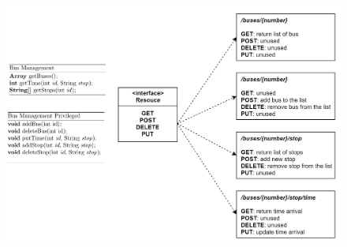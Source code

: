 \documentclass{article}
\begin{document}
\begin{figure}[H]
  \centering
  \includegraphics[scale=0.8]{cattura14.png}
\end{figure}
\end{document}
